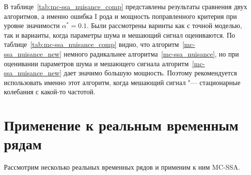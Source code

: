 \documentclass[specialist,
substylefile = spbu_report.rtx,
subf,href,colorlinks=true, 12pt]{disser}
\theoremstyle{definition}
\begin{document}
В таблице~\ref{tab:mc-ssa_nuisance_comp} представлены результаты сравнения двух алгоритмов, а именно ошибка I рода и мощность поправленного критерия при уровне значимости $\alpha^*=0.1$. Были рассмотрены варинты как с точной моделью, так и варианты, когда параметры шума и мешающий сигнал оцениваются. По таблице~\ref{tab:mc-ssa_nuisance_comp} видно, что алгоритм~\ref{mc-ssa_nuisance_new} немного радикальнее алгоритма~\ref{mc-ssa_nuisance}, но при оценивании параметров шума и мешающего сигнала алгоритм~\ref{mc-ssa_nuisance_new} дает значимо б$\acute{\text{о}}$льшую мощность. Поэтому рекомендуется использовать именно этот алгоритм, когда мешающий сигнал "--- стационарные колебания с какой-то частотой.

\section{Применение к реальным временным рядам}\label{sect:examples}
Рассмотрим несколько реальных временных рядов и применим к ним MC-SSA.
\end{document}
